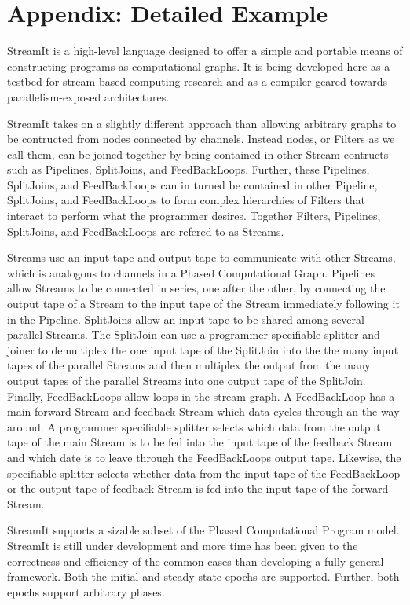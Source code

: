 \section{Appendix: Detailed Example}
StreamIt is a high-level language designed to offer a simple and portable means of constructing programs as computational graphs. It is being developed here as a testbed for stream-based computing research and as a compiler geared towards parallelism-exposed architectures.

StreamIt takes on a slightly different approach than allowing arbitrary graphs to be contructed from nodes connected by channels. Instead nodes, or Filters as we call them, can be joined together by being contained in other Stream contructs such as Pipelines, SplitJoins, and FeedBackLoops. Further, these Pipelines, SplitJoins, and FeedBackLoops can in turned be contained in other Pipeline, SplitJoins, and FeedBackLoops to form complex hierarchies of Filters that interact to perform what the programmer desires. Together Filters, Pipelines, SplitJoins, and FeedBackLoops are refered to as Streams.

Streams use an input tape and output tape to communicate with other Streams, which is analogous to channels in a Phased Computational Graph. Pipelines allow Streams to be connected in series, one after the other, by connecting the output tape of a Stream to the input tape of the Stream immediately following it in the Pipeline. SplitJoins allow an input tape to be shared among several parallel Streams. The SplitJoin can use a programmer specifiable splitter and joiner to demultiplex the one input tape of the SplitJoin into the the many input tapes of the parallel Streams and then multiplex the output from the many output tapes of the parallel Streams into one output tape of the SplitJoin. Finally, FeedBackLoops allow loops in the stream graph. A FeedBackLoop has a main forward Stream and feedback Stream which data cycles through an the way around. A programmer specifiable splitter selects which data from the output tape of the main Stream is to be fed into the input tape of the feedback Stream and which date is to leave through the FeedBackLoops output tape. Likewise, the specifiable splitter selects whether data from the input tape of the FeedBackLoop or the output tape of feedback Stream is fed into the input tape of the forward Stream.

StreamIt supports a sizable subset of the Phased Computational Program model. StreamIt is still under development and more time has been given to the correctness and efficiency of the common cases than developing a fully general framework. Both the initial and steady-state epochs are supported. Further, both epochs support arbitrary phases.

